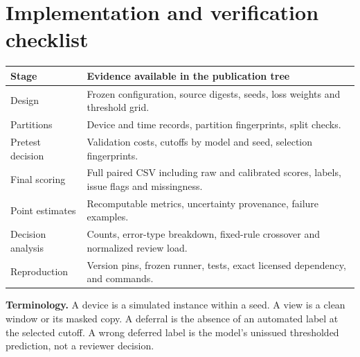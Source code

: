 \documentclass[11pt,letterpaper]{article}
\begin{document}
\clearpage
\appendix
\section{Implementation and verification checklist}
\begin{tabular}{@{}p{.29\linewidth}p{.66\linewidth}@{}}
\toprule
Stage & Evidence available in the publication tree\\
\midrule
Design & Frozen configuration, source digests, seeds, loss weights and threshold grid.\\[4pt]
Partitions & Device and time records, partition fingerprints, split checks.\\[4pt]
Pretest decision & Validation costs, cutoffs by model and seed, selection fingerprints.\\[4pt]
Final scoring & Full paired CSV including raw and calibrated scores, labels, issue flags and missingness.\\[4pt]
Point estimates & Recomputable metrics, uncertainty provenance, failure examples.\\[4pt]
Decision analysis & Counts, error-type breakdown, fixed-rule crossover and normalized review load.\\[4pt]
Reproduction & Version pins, frozen runner, tests, exact licensed dependency, and commands.\\
\bottomrule
\end{tabular}

\textbf{Terminology.} A device is a simulated instance within a seed. A view is a clean window or its masked copy. A deferral is the absence of an automated label at the selected cutoff. A wrong deferred label is the model's unissued thresholded prediction, not a reviewer decision.



\end{document}
